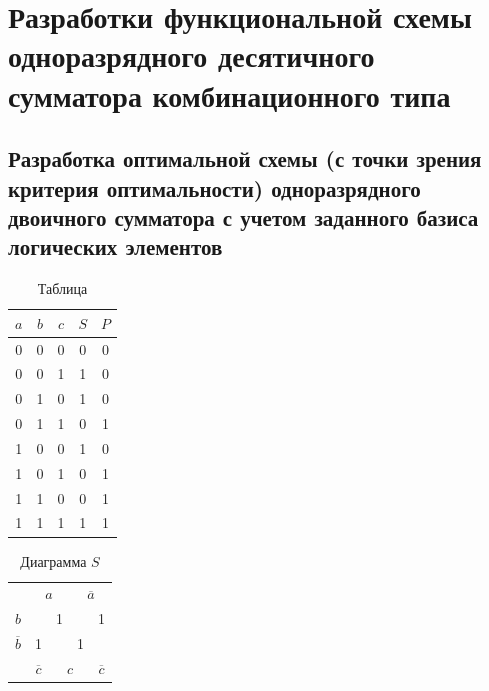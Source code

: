 \documentclass[a4paper,14pt]{article}
\begin{document}
\section{Разработки функциональной схемы одноразрядного десятичного сумматора комбинационного типа}

\subsection{Разработка оптимальной схемы (с точки зрения критерия оптимальности) одноразрядного двоичного сумматора с учетом заданного базиса логических элементов}

\begin{table}[H]
	\begin{center}
		\caption{\label{tab:tab1} Таблица}
		\begin{tabular}{|c c c|c c|}
			\hline
			$a$ & $b$ & $c$ & $S$ & $P$ \\ \hline
			0 & 0 & 0 & 0 & 0 \\ 
			0 & 0 & 1 & 1 & 0 \\ 
			0 & 1 & 0 & 1 & 0 \\ 
			0 & 1 & 1 & 0 & 1 \\ \hline
			1 & 0 & 0 & 1 & 0 \\ 
			1 & 0 & 1 & 0 & 1 \\ 
			1 & 1 & 0 & 0 & 1 \\ 
			1 & 1 & 1 & 1 & 1 \\ \hline
		\end{tabular}
	\end{center}
\end{table}

\begin{table}[H]
	\begin{center}
		\caption{\label{tab:tab2} Диаграмма $S$}
		\begin{tabular}{ccccc}
			& \multicolumn{2}{c}{$a$}                           & \multicolumn{2}{c}{$\overline{a}$}                          \\ \cline{2-5} 
			\multicolumn{1}{c|}{$b$}  & \multicolumn{1}{c|}{}  & \multicolumn{1}{c|}{1} & \multicolumn{1}{c|}{}  & \multicolumn{1}{c|}{1} \\ \cline{2-5} 
			\multicolumn{1}{c|}{$\overline{b}$} & \multicolumn{1}{c|}{1} & \multicolumn{1}{c|}{}  & \multicolumn{1}{c|}{1} & \multicolumn{1}{c|}{}  \\ \cline{2-5} 
			& $\overline{c}$                     & \multicolumn{2}{c}{$c$}                          & $\overline{c}$                     
		\end{tabular}
	\end{center}
\end{table}
\end{document}
